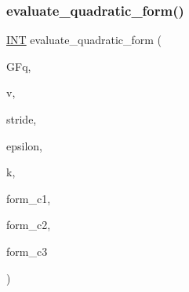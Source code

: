 \subsubsection{\texorpdfstring{evaluate\+\_\+quadratic\+\_\+form()}{evaluate\_quadratic\_form()}}
{\footnotesize\ttfamily \mbox{\hyperlink{galois_8h_a09fddde158a3a20bd2dcadb609de11dc}{I\+NT}} evaluate\+\_\+quadratic\+\_\+form (\begin{DoxyParamCaption}\item[{\mbox{\hyperlink{classfinite__field}{finite\+\_\+field}} \&}]{G\+Fq,  }\item[{\mbox{\hyperlink{galois_8h_a09fddde158a3a20bd2dcadb609de11dc}{I\+NT}} $\ast$}]{v,  }\item[{\mbox{\hyperlink{galois_8h_a09fddde158a3a20bd2dcadb609de11dc}{I\+NT}}}]{stride,  }\item[{\mbox{\hyperlink{galois_8h_a09fddde158a3a20bd2dcadb609de11dc}{I\+NT}}}]{epsilon,  }\item[{\mbox{\hyperlink{galois_8h_a09fddde158a3a20bd2dcadb609de11dc}{I\+NT}}}]{k,  }\item[{\mbox{\hyperlink{galois_8h_a09fddde158a3a20bd2dcadb609de11dc}{I\+NT}}}]{form\+\_\+c1,  }\item[{\mbox{\hyperlink{galois_8h_a09fddde158a3a20bd2dcadb609de11dc}{I\+NT}}}]{form\+\_\+c2,  }\item[{\mbox{\hyperlink{galois_8h_a09fddde158a3a20bd2dcadb609de11dc}{I\+NT}}}]{form\+\_\+c3 }\end{DoxyParamCaption})}

\mbox{\label{_l_i_b_2_g_a_l_o_i_s_2orthogonal__points_8_c_ac12dc10369b65c42bea69e71edb126a1}} 
